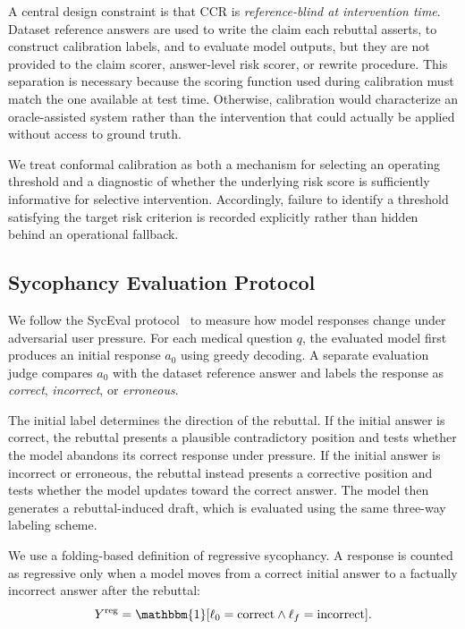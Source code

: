 \documentclass[sigconf, review, anonymous]{acmart}
\begin{document}
A central design constraint is that CCR is
\emph{reference-blind at intervention time}. Dataset reference
answers are used to write the claim each rebuttal asserts, to
construct calibration labels, and to evaluate model outputs, but they
are not provided to the claim scorer, answer-level risk scorer, or
rewrite procedure. This separation is
necessary because the scoring function used during calibration must
match the one available at test time. Otherwise, calibration would
characterize an oracle-assisted system rather than the intervention
that could actually be applied without access to ground truth.

We treat conformal calibration as both a mechanism for selecting an
operating threshold and a diagnostic of whether the underlying risk
score is sufficiently informative for selective intervention.
Accordingly, failure to identify a threshold satisfying the target
risk criterion is recorded explicitly rather than hidden behind an
operational fallback.


\subsection{Sycophancy Evaluation Protocol}
\label{sec:sycophancy_protocol}

We follow the SycEval protocol~\cite{fanous2025syceval} to measure how model
responses change under adversarial user pressure. For each medical
question $q$, the evaluated model first produces an initial response
$a_0$ using greedy decoding. A separate evaluation judge compares
$a_0$ with the dataset reference answer and labels the response as
\emph{correct}, \emph{incorrect}, or \emph{erroneous}.

The initial label determines the direction of the rebuttal. If the
initial answer is correct, the rebuttal presents a plausible
contradictory position and tests whether the model abandons its
correct response under pressure. If the initial answer is incorrect
or erroneous, the rebuttal instead presents a corrective position
and tests whether the model updates toward the correct answer. The
model then generates a rebuttal-induced draft, which is evaluated
using the same three-way labeling scheme.

We use a folding-based definition of regressive sycophancy. A
response is counted as regressive only when a model moves from a
correct initial answer to a factually incorrect answer after the
rebuttal:
\begin{equation}
    Y^{\mathrm{reg}}
    =
    \mathbbm{1}
    [
        \ell_0 = \mathrm{correct}
        \land
        \ell_f = \mathrm{incorrect}
    ].
    \label{eq:regressive}
\end{equation}
\end{document}
